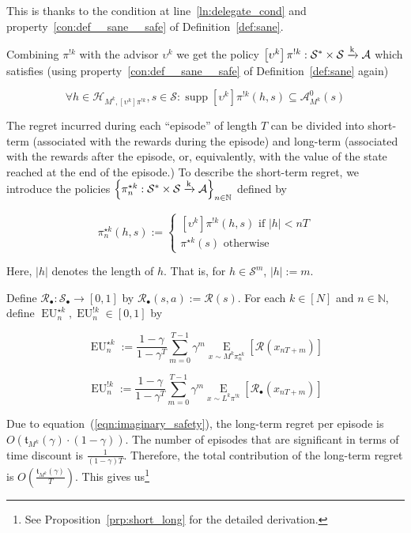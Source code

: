 \documentclass[anon,12pt]{colt2018} %
\DeclareMathOperator{\Supp}{supp}
\newcommand{\AP}[1]{\left(#1\right)}
\newcommand{\AB}[1]{\left[#1\right]}
\newcommand{\AC}[1]{\left\{#1\right\}}
\newcommand{\Ea}[2]{\underset{#1}{\operatorname{E}}\AB{#2}}
\newcommand{\Nats}{\mathbb{N}}
\newcommand{\Abs}[1]{\left\vert #1 \right\vert}
\newcommand{\K}{\xrightarrow{\textnormal{k}}}
\newcommand{\A}{\mathcal{A}}
\newcommand{\St}{\mathcal{S}}
\newcommand{\R}{\mathcal{R}}
\newcommand{\EU}{\operatorname{EU}}
\newcommand{\MP}[2]{#1#2}
\newcommand{\AdP}[2]{\AB{#1}#2}
\newcommand{\Tn}{\mathfrak{t}}
\newcommand{\Ad}{\upsilon}
\newcommand{\FH}{\mathcal{H}}
\newcommand{\X}{\bullet}
\newcommand{\IP}{\pi^{!k}}
\begin{document}
This is thanks to the condition at line~\ref{ln:delegate_cond} and property~\ref{con:def__sane__safe} of Definition~\ref{def:sane}.

Combining $\pi^{!k}$ with the advisor $\Ad^k$ we get the policy $\AdP{\Ad^k}{\IP}: \St^*\times\St\K\A$ which satisfies (using property~\ref{con:def__sane__safe} of Definition~\ref{def:sane} again)

\begin{equation}
\label{eqn:imaginary_safety}
\forall h\in\FH_{M^k,\AdP{\Ad^k}{\IP}},s\in\St: \Supp{\AdP{\Ad^k}{\IP}(h,s)} \subseteq \A_{M^k}^0(s)
\end{equation}

The regret incurred during each \enquote{episode} of length $T$ can be divided into short-term (associated with the rewards during the episode) and long-term (associated with the rewards after the episode, or, equivalently, with the value of the state reached at the end of the episode.) To describe the short-term regret, we introduce the policies $\AC{\pi_n^{\star k}: \St^* \times \St \K \A}_{n \in \Nats}$ defined by

\begin{equation}
\pi_n^{\star k}(h,s):=\begin{cases} \AdP{\Ad^k}{\IP}(h,s) \text{ if } \Abs{h} < nT \\ \pi^{\star k}(s) \text{ otherwise} \end{cases}
\end{equation}

Here, $\Abs{h}$ denotes the length of $h$. That is, for $h \in \St^m$, $\Abs{h}:=m$.

Define $\R_\X: \St_\X \rightarrow [0,1]$ by $\R_\X(s,a):=\R(s)$. For each $k\in[N]$ and $n\in\Nats$, define $\EU_n^{\star k},\EU_n^{!k}\in[0,1]$ by

\begin{equation}
\label{eqn:eustar}
\EU_n^{\star k}:=\frac{1-\gamma}{1-\gamma^T}\sum_{m=0}^{T-1} \gamma^m \Ea{x\sim{\MP{M^k}{\pi_n^{\star  k}}}}{\R\AP{x_{nT+m}}}
\end{equation}

\begin{equation}
\label{eqn:eushriek}
\EU_n^{!k}:=\frac{1-\gamma}{1-\gamma^T}\sum_{m=0}^{T-1} \gamma^m \Ea{x\sim{\MP{L^k}{\IP}}}{\R_\X\AP{x_{nT+m}}}
\end{equation}

Due to equation~(\ref{eqn:imaginary_safety}), the long-term regret per episode is $O\AP{\Tn_{M^k}(\gamma)\cdot(1-\gamma)}$. The number of episodes that are significant in terms of time discount is $\frac{1}{(1-\gamma)T}$. Therefore, the total contribution of the long-term regret is $O\AP{\frac{\Tn_{M^k}(\gamma)}{T}}$. This gives us\footnote{See Proposition~\ref{prp:short_long} for the detailed derivation.}
\end{document}
